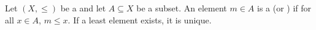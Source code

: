 \begin{definition} \label{definition:least_element_in_a_subset_of_a_partially_ordered_set}
Let $(X, \leq)$ be a  and let $A \subseteq X$ be a subset. 
An element $m \in A$ is a  (or ) if for all $x \in A$, $m \leq x$. If a least element exists, it is unique.
\end{definition}